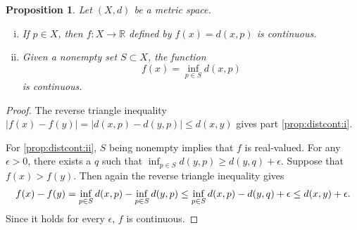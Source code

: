 \documentclass[12pt,openany]{book}
\newcommand{\avoidbreak}{\postdisplaypenalty=100}
\newcommand{\sabs}[1]{\lvert {#1} \rvert}
\newcommand{\R}{{\mathbb{R}}}
\theoremstyle{plain}
\newtheorem{prop}[thm]{Proposition}
\theoremstyle{remark}
\theoremstyle{definition}
\theoremstyle{exercise}
\theoremstyle{example}
\begin{document}
\begin{prop}\label{prop:distcont}
Let $(X,d)$ be a metric space.
\begin{enumerate}[(i)]
\item\label{prop:distcont:i}
If $p \in X$,
then $f \colon X \to \R$ defined
by $f(x) = d(x,p)$ is continuous.
\item\label{prop:distcont:ii}
Given a nonempty set $S \subset X$, the function
\begin{equation*}
f(x) = \inf_{p \in S} d(x,p)
\end{equation*}
is continuous.
\end{enumerate}
\end{prop}

\begin{proof}
The reverse triangle inequality
$\sabs{f(x)-f(y)} = \sabs{d(x,p)-d(y,p)} \leq d(x,y)$
gives part \ref{prop:distcont:i}.

For \ref{prop:distcont:ii}, $S$ being nonempty implies that $f$ is
real-valued.  For any $\epsilon > 0$, there exists a $q$ such that
$\inf_{p \in S} d(y,p) \geq d(y,q) + \epsilon$.  Suppose that $f(x) > f(y)$.
Then again the reverse triangle inequality gives
\begin{equation*}
f(x)-f(y) =
\inf_{p \in S} d(x,p)
-
\inf_{p \in S} d(y,p)
\leq
\inf_{p \in S} d(x,p) - d(y,q) + \epsilon 
\leq d(x,y) + \epsilon.
\avoidbreak
\end{equation*}
Since it holds for every $\epsilon$, $f$ is continuous.
\end{proof}
\end{document}
